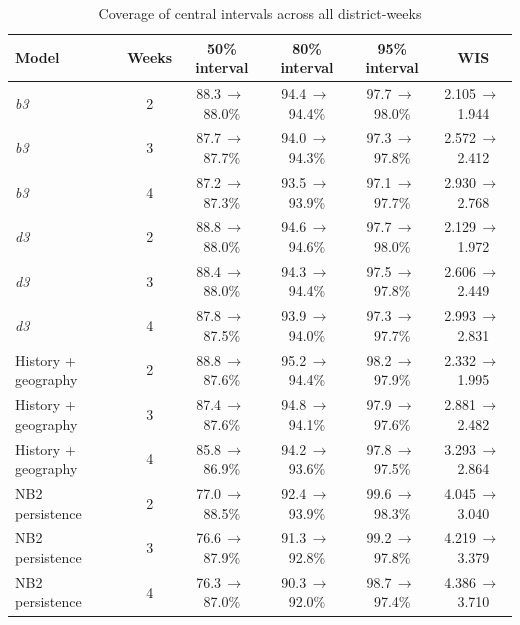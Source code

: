 \documentclass[10pt]{article}
\newcommand{\bthree}{\textit{b3}}
\newcommand{\dthree}{\textit{d3}}
\newcommand{\ra}{\,$\rightarrow$\,}
\begin{document}
\begin{table}[!h]
\centering
\caption{Coverage of central intervals across all district-weeks}
\small
\begin{tabular}{@{}lccccc@{}}
\toprule
Model & Weeks & 50\% interval & 80\% interval & 95\% interval & WIS\\
\midrule
\bthree{} & 2 & 88.3\ra 88.0\% & 94.4\ra 94.4\% & 97.7\ra 98.0\% & 2.105\ra 1.944\\
\bthree{} & 3 & 87.7\ra 87.7\% & 94.0\ra 94.3\% & 97.3\ra 97.8\% & 2.572\ra 2.412\\
\bthree{} & 4 & 87.2\ra 87.3\% & 93.5\ra 93.9\% & 97.1\ra 97.7\% & 2.930\ra 2.768\\
\dthree{} & 2 & 88.8\ra 88.0\% & 94.6\ra 94.6\% & 97.7\ra 98.0\% & 2.129\ra 1.972\\
\dthree{} & 3 & 88.4\ra 88.0\% & 94.3\ra 94.4\% & 97.5\ra 97.8\% & 2.606\ra 2.449\\
\dthree{} & 4 & 87.8\ra 87.5\% & 93.9\ra 94.0\% & 97.3\ra 97.7\% & 2.993\ra 2.831\\
History + geography & 2 & 88.8\ra 87.6\% & 95.2\ra 94.4\% & 98.2\ra 97.9\% & 2.332\ra 1.995\\
History + geography & 3 & 87.4\ra 87.6\% & 94.8\ra 94.1\% & 97.9\ra 97.6\% & 2.881\ra 2.482\\
History + geography & 4 & 85.8\ra 86.9\% & 94.2\ra 93.6\% & 97.8\ra 97.5\% & 3.293\ra 2.864\\
NB2 persistence & 2 & 77.0\ra 88.5\% & 92.4\ra 93.9\% & 99.6\ra 98.3\% & 4.045\ra 3.040\\
NB2 persistence & 3 & 76.6\ra 87.9\% & 91.3\ra 92.8\% & 99.2\ra 97.8\% & 4.219\ra 3.379\\
NB2 persistence & 4 & 76.3\ra 87.0\% & 90.3\ra 92.0\% & 98.7\ra 97.4\% & 4.386\ra 3.710\\
\bottomrule
\end{tabular}
\end{table}
\end{document}
